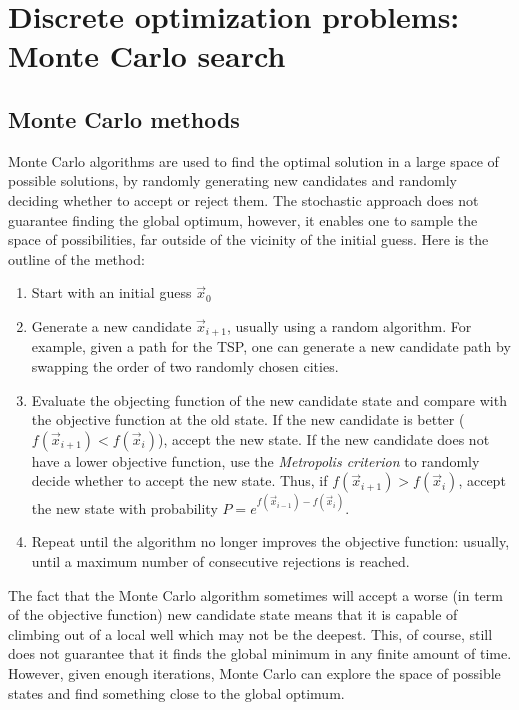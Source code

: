 \documentclass[
  letterpaper,
  DIV=11,
  numbers=noendperiod]{scrreprt}
\begin{document}

\chapter{Discrete optimization problems: Monte Carlo
search}\label{discrete-optimization-problems-monte-carlo-search}

\section{Monte Carlo methods}\label{monte-carlo-methods}

Monte Carlo algorithms are used to find the optimal solution in a large
space of possible solutions, by randomly generating new candidates and
randomly deciding whether to accept or reject them. The stochastic
approach does not guarantee finding the global optimum, however, it
enables one to sample the space of possibilities, far outside of the
vicinity of the initial guess. Here is the outline of the method:

\begin{enumerate}
\def\labelenumi{\arabic{enumi}.}
\item
  Start with an initial guess \(\vec x_0\)
\item
  Generate a new candidate \(\vec x_{i+1}\), usually using a random
  algorithm. For example, given a path for the TSP, one can generate a
  new candidate path by swapping the order of two randomly chosen
  cities.
\item
  Evaluate the objecting function of the new candidate state and compare
  with the objective function at the old state. If the new candidate is
  better (\(f(\vec x_{i+1}) < f(\vec x_i)\)), accept the new state. If
  the new candidate does not have a lower objective function, use the
  \emph{Metropolis criterion} to randomly decide whether to accept the
  new state. Thus, if \(f(\vec x_{i+1}) > f(\vec x_i)\), accept the new
  state with probability \(P = e^{f(\vec x_{i-1}) - f(\vec x_i)}\).
\item
  Repeat until the algorithm no longer improves the objective function:
  usually, until a maximum number of consecutive rejections is reached.
\end{enumerate}

The fact that the Monte Carlo algorithm sometimes will accept a worse
(in term of the objective function) new candidate state means that it is
capable of climbing out of a local well which may not be the deepest.
This, of course, still does not guarantee that it finds the global
minimum in any finite amount of time. However, given enough iterations,
Monte Carlo can explore the space of possible states and find something
close to the global optimum.
\end{document}
